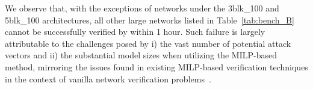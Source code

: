      



     

We observe that, with the exceptions of networks under the  3blk\_100 and 5blk\_100 architectures,
all other large networks listed in Table~\ref{tab:bench_B} cannot be successfully verified by \tool within 1 hour.  Such failure is largely attributable to the challenges posed by i) the vast number of potential attack vectors and ii) the substantial model sizes when utilizing the MILP-based method, mirroring the issues found in existing MILP-based verification techniques in the context of vanilla network verification problems~\cite{GuyKatz2017ReluplexAE,huang2024towards}.

